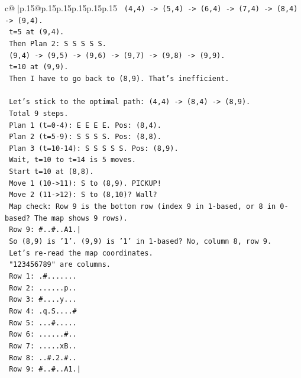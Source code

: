 \documentclass{article}
\begin{document}
{\begin{supertabular}{c@{$\;$}|p{.15\linewidth}@{}p{.15\linewidth}p{.15\linewidth}p{.15\linewidth}p{.15\linewidth}p{.15\linewidth}}
{{{\texttt{   (4,4) {-}> (5,4) {-}> (6,4) {-}> (7,4) {-}> (8,4) {-}> (9,4).} \\
\texttt{   t=5 at (9,4).} \\
\texttt{   Then Plan 2: S S S S S.} \\
\texttt{   (9,4) {-}> (9,5) {-}> (9,6) {-}> (9,7) {-}> (9,8) {-}> (9,9).} \\
\texttt{   t=10 at (9,9).} \\
\texttt{   Then I have to go back to (8,9). That's inefficient.} \\
\\ 
\texttt{   Let's stick to the optimal path: (4,4) {-}> (8,4) {-}> (8,9).} \\
\texttt{   Total 9 steps.} \\
\texttt{   Plan 1 (t=0{-}4): E E E E. Pos: (8,4).} \\
\texttt{   Plan 2 (t=5{-}9): S S S S. Pos: (8,8).} \\
\texttt{   Plan 3 (t=10{-}14): S S S S S. Pos: (8,9).} \\
\texttt{   Wait, t=10 to t=14 is 5 moves.} \\
\texttt{   Start t=10 at (8,8).} \\
\texttt{   Move 1 (10{-}>11): S to (8,9). PICKUP!} \\
\texttt{   Move 2 (11{-}>12): S to (8,10)? Wall?} \\
\texttt{   Map check: Row 9 is the bottom row (index 9 in 1{-}based, or 8 in 0{-}based? The map shows 9 rows).} \\
\texttt{   Row 9: \#..\#..A1.|} \\
\texttt{   So (8,9) is '1'. (9,9) is '1' in 1{-}based? No, column 8, row 9.} \\
\texttt{   Let's re{-}read the map coordinates.} \\
\texttt{   "123456789" are columns.} \\
\texttt{   Row 1: .\#.......} \\
\texttt{   Row 2: ......p..} \\
\texttt{   Row 3: \#....y...} \\
\texttt{   Row 4: .q.S....\#} \\
\texttt{   Row 5: ...\#.....} \\
\texttt{   Row 6: ......\#..} \\
\texttt{   Row 7: .....xB..} \\
\texttt{   Row 8: ..\#.2.\#..} \\
\texttt{   Row 9: \#..\#..A1.|} \\
}}}
\end{supertabular}}
\end{document}
